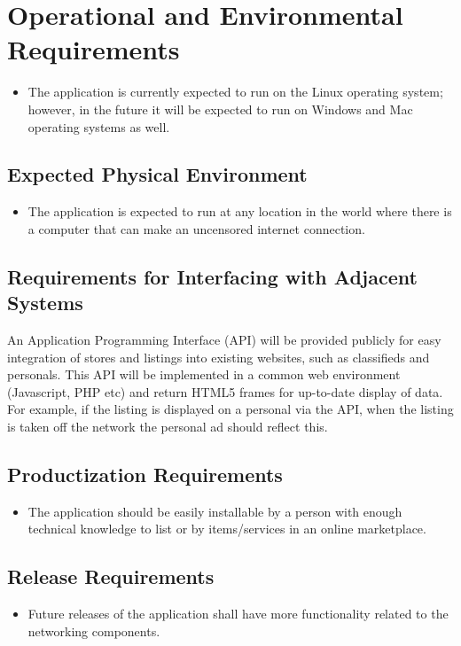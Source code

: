 \documentclass{article}
\begin{document}
\section{Operational and Environmental Requirements}
\begin{itemize}
	\item 
    The application is currently expected to run on the Linux operating system; however, in the future it will be expected to run on Windows and Mac operating systems as well.
\end{itemize}
\subsection{Expected Physical Environment}
\begin{itemize}
	\item 
	The application is expected to run at any location in the world where there is a computer that can make an uncensored internet connection.
\end{itemize}

\subsection{Requirements for Interfacing with Adjacent Systems}
An Application Programming Interface (API) will be provided publicly for easy integration of stores and listings into existing websites, such as classifieds and personals. This API will be implemented in a common web environment (Javascript, PHP etc) and return HTML5 frames for up-to-date display of data. For example, if the listing is displayed on a personal via the API, when the listing is taken off the network the personal ad should reflect this.

\subsection{Productization Requirements}
\begin{itemize}
	\item 
	The application should be easily installable by a person with enough technical knowledge to list or by items/services in an online marketplace.
\end{itemize}

\subsection{Release Requirements}
\begin{itemize}
	\item
	Future releases of the application shall have more functionality related to the networking components.
\end{itemize}
\end{document}
